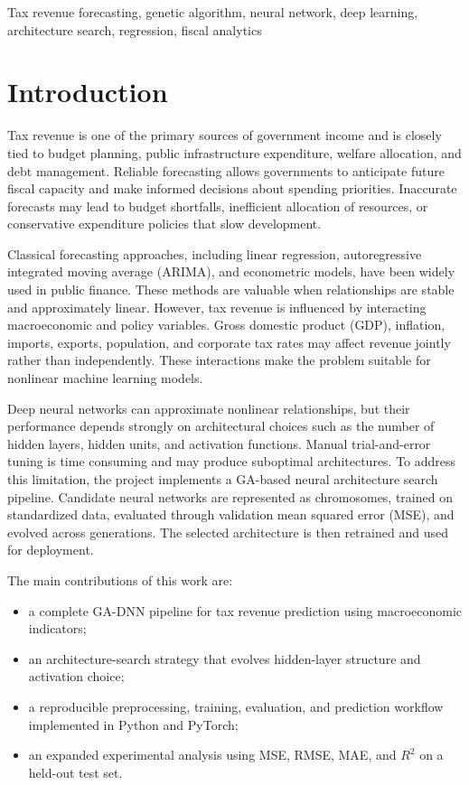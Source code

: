 \documentclass[conference]{IEEEtran}
\begin{document}
\begin{IEEEkeywords}
Tax revenue forecasting, genetic algorithm, neural network, deep learning, architecture search, regression, fiscal analytics
\end{IEEEkeywords}

\section{Introduction}
Tax revenue is one of the primary sources of government income and is closely tied to budget planning, public infrastructure expenditure, welfare allocation, and debt management. Reliable forecasting allows governments to anticipate future fiscal capacity and make informed decisions about spending priorities. Inaccurate forecasts may lead to budget shortfalls, inefficient allocation of resources, or conservative expenditure policies that slow development.

Classical forecasting approaches, including linear regression, autoregressive integrated moving average (ARIMA), and econometric models, have been widely used in public finance. These methods are valuable when relationships are stable and approximately linear. However, tax revenue is influenced by interacting macroeconomic and policy variables. Gross domestic product (GDP), inflation, imports, exports, population, and corporate tax rates may affect revenue jointly rather than independently. These interactions make the problem suitable for nonlinear machine learning models.

Deep neural networks can approximate nonlinear relationships, but their performance depends strongly on architectural choices such as the number of hidden layers, hidden units, and activation functions. Manual trial-and-error tuning is time consuming and may produce suboptimal architectures. To address this limitation, the project implements a GA-based neural architecture search pipeline. Candidate neural networks are represented as chromosomes, trained on standardized data, evaluated through validation mean squared error (MSE), and evolved across generations. The selected architecture is then retrained and used for deployment.

The main contributions of this work are:
\begin{itemize}
    \item a complete GA-DNN pipeline for tax revenue prediction using macroeconomic indicators;
    \item an architecture-search strategy that evolves hidden-layer structure and activation choice;
    \item a reproducible preprocessing, training, evaluation, and prediction workflow implemented in Python and PyTorch;
    \item an expanded experimental analysis using MSE, RMSE, MAE, and $R^{2}$ on a held-out test set.
\end{itemize}
\end{document}
